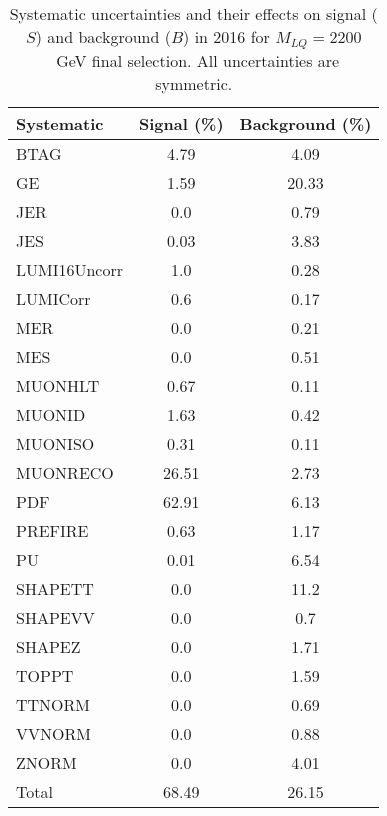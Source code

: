 \begin{table}[htbp]
\begin{center}
\caption{Systematic uncertainties and their effects on signal ($S$) and background ($B$) in 2016 for $M_{LQ}=2200$~GeV final selection. All uncertainties are symmetric.}
\begin{tabular}{lcc}
\hline\hline
Systematic & Signal (\%) & Background (\%) \\ \hline 
BTAG & 4.79 & 4.09\\ 
GE & 1.59 & 20.33\\ 
JER & 0.0 & 0.79\\ 
JES & 0.03 & 3.83\\ 
LUMI16Uncorr & 1.0 & 0.28\\ 
LUMICorr & 0.6 & 0.17\\ 
MER & 0.0 & 0.21\\ 
MES & 0.0 & 0.51\\ 
MUONHLT & 0.67 & 0.11\\ 
MUONID & 1.63 & 0.42\\ 
MUONISO & 0.31 & 0.11\\ 
MUONRECO & 26.51 & 2.73\\ 
PDF & 62.91 & 6.13\\ 
PREFIRE & 0.63 & 1.17\\ 
PU & 0.01 & 6.54\\ 
SHAPETT & 0.0 & 11.2\\ 
SHAPEVV & 0.0 & 0.7\\ 
SHAPEZ & 0.0 & 1.71\\ 
TOPPT & 0.0 & 1.59\\ 
TTNORM & 0.0 & 0.69\\ 
VVNORM & 0.0 & 0.88\\ 
ZNORM & 0.0 & 4.01\\ 
Total & 68.49 & 26.15\\ \hline \hline
\end{tabular}
\label{tab:SysUncertainties_uujj_2200}
\end{center}
\end{table}

